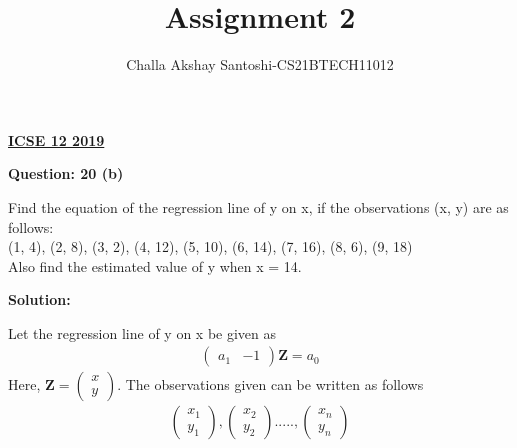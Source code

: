 \documentclass[journal,12pt,twocolumn]{IEEEtran}
\begin{document}
\newcommand{\myvec}[1]{\ensuremath{\begin{pmatrix}#1\end{pmatrix}}}
\newcommand{\mydet}[1]{\ensuremath{\begin{vmatrix}#1\end{vmatrix}}}
\makeatletter
{}
\makeatother
\let\StandardTheFigure\thefigure
\let\vec\mathbf
\renewcommand{\thefigure}{\theproblem}
\def\putbox#1#2#3{\makebox[0in][l]{\makebox[#1][l]{}\raisebox{\baselineskip}[0in][0in]{\raisebox{#2}[0in][0in]{#3}}}}
     \def\rightbox#1{\makebox[0in][r]{#1}}
     \def\centbox#1{\makebox[0in]{#1}}
     \def\topbox#1{\raisebox{-\baselineskip}[0in][0in]{#1}}
     \def\midbox#1{\raisebox{-0.5\baselineskip}[0in][0in]{#1}}
\vspace{3cm}
\title{Assignment 2}
\author{Challa Akshay Santoshi-CS21BTECH11012}
\maketitle
\newpage
\bigskip
\renewcommand{\thefigure}{\theenumi}
\renewcommand{\thetable}{\theenumi}
\begin{center}
  \textbf{\underline{ICSE 12 2019}}\\
\end{center}
\begin{center}
  \textbf{Question: 20 (b)}  
\end{center}
Find the equation of the regression line of y on x, if the observations (x, y) are as follows:\\
(1, 4), (2, 8), (3, 2), (4, 12), (5, 10), (6, 14), (7, 16), (8, 6), (9, 18)\\
Also find the estimated value of y when x = 14.\\
\begin{center}
  \textbf{Solution:}  
\end{center}
Let the regression line of y on x be given as\\
\begin{align}
    \myvec{a_1 & -1}\vec{Z} = a_0
\end{align}
Here, $\vec{Z} = \myvec{x\\y}$.
The observations given can be written as follows\\
\begin{align}
		 \myvec{x_1\\y_1},\myvec{x_2\\y_2}.....,\myvec{x_n\\y_n}
\end{align}
\end{document}

